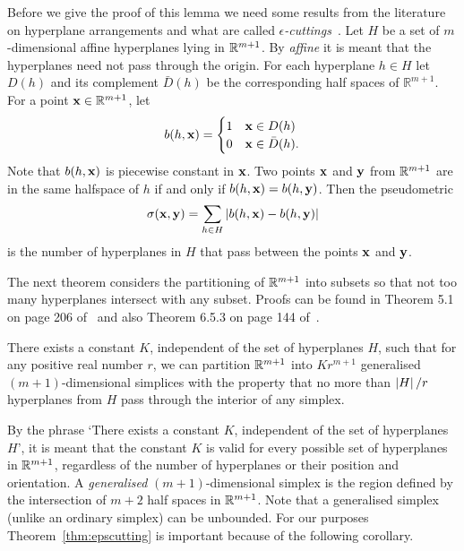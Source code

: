 \documentclass[journal]{IEEEtran}
\begin{document}
Before we give the proof of this lemma we need some results from the literature on hyperplane arrangements and what are called \emph{$\epsilon$-cuttings}~\cite{Chazelle_discrepency_method_2000,Matousek_lect_disc_geom_2002}.  Let $H$ be a set of $m$-dimensional affine hyperplanes lying in ${\mathbb R}^{m+1}$.  By \emph{affine} it is meant that  the hyperplanes need not pass through the origin.  For each hyperplane $h \in H$ let $D(h)$ and its complement $\bar{D}(h)$ be the corresponding half spaces of $\mathbb{R}^{m+1}$.  For a point $\mathbf{x} \in \mathbb{R}^{m+1}$, let
\begin{equation}\label{eq:bhsi}
b(h,\xbf) = \begin{cases} 
1 & \xbf \in D(h) \\
0 & \xbf \in \bar{D}(h).
\end{cases}
\end{equation}
Note that $b(h,\mathbf{x})$ is piecewise constant in $\mathbf{x}$.  Two points $\mathbf{x}$ and $\mathbf{y}$ from ${\mathbb R}^{m+1}$ are in the same halfspace of $h$ if and only if $b(h, \mathbf{x}) = b(h, \mathbf{y})$.  Then the pseudometric
\[
\sigma(\mathbf{x},\mathbf{y}) = \sum_{h \in H} |b(h,\mathbf{x}) - b(h,\mathbf{y})|
\]
is the number of hyperplanes in $H$ that pass between the points $\mathbf{x}$ and $\mathbf{y}$.  %

The next theorem considers the partitioning of ${\mathbb R}^{m+1}$ into subsets so that not too many hyperplanes intersect with any subset.  Proofs can be found in Theorem 5.1 on page 206 of~\cite{Chazelle_discrepency_method_2000} and also Theorem 6.5.3 on page 144 of~\cite{Matousek_lect_disc_geom_2002}.

\begin{theorem}\label{thm:epscutting}
There exists a constant $K$, independent of the set of hyperplanes $H$, such that for any positive real number $r$, we can partition ${\mathbb R}^{m+1}$ into $K r^{m+1}$ generalised $(m+1)$-dimensional simplices with the property that no more than $\left\vert H \right\vert/r$ hyperplanes from $H$ pass through the interior of any simplex.
\end{theorem}

By the phrase `There exists a constant $K$, independent of the set of hyperplanes $H$', it is meant that the constant $K$ is valid for every possible set of hyperplanes in ${\mathbb R}^{m+1}$, regardless of the number of hyperplanes or their position and orientation.  A \emph{generalised} $(m+1)$-dimensional simplex is the region defined by the intersection of $m+2$ half spaces in ${\mathbb R}^{m+1}$.  Note that a generalised simplex (unlike an ordinary simplex) can be unbounded.  For our purposes Theorem~\ref{thm:epscutting} is important because of the following corollary.
\end{document}
